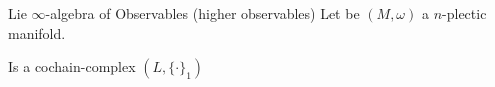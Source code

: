 \documentclass[10pt]{beamer}
\begin{document}
\begin{frame}[fragile]{Lie $\infty$-algebra of Observables (higher observables) }
	Let be $(M,\omega)$ a $n$-plectic manifold.
	  	\vfill
	\begin{defblock}
		\medskip
		\hspace{.25em} Is a cochain-complex $(L,\{\cdot\}_1)$ \\
		\vspace{-1em}
		\begin{center}
			
		\end{center}
	\end{defblock}
%			
  \end{frame}
\end{document}
